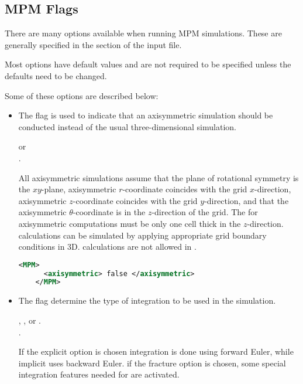 \subsection{MPM Flags} \label{Sec:MPMFlags}

There are many options available when running MPM simulations.  These
are generally specified in the  section of the input file.
\begin{NoteBox}
Most options have default values and are not required to be specified
unless the defaults need to be changed.
\end{NoteBox}

Some of these options are described below:
\begin{itemize}
  \item {}  The  flag is used
    to indicate that an axisymmetric simulation should be conducted instead
    of the usual three-dimensional simulation.  

      or \\
     .

    All axisymmetric simulations
    assume that the plane of rotational symmetry is the $xy$-plane,
    axisymmetric $r$-coordinate coincides with the grid $x$-direction, 
    axisymmetric $z$-coordinate coincides 
    with the grid $y$-direction, and that the axisymmetric $\theta$-coordinate is 
    in the $z$-direction of the grid. The
     for axisymmetric computations must be only one cell thick
    in the $z$-direction.  calculations can be simulated
    by applying appropriate grid boundary conditions in 3D.  
    calculations are not allowed in \Vaango.
    \begin{lstlisting}[language=XML]
    <MPM>
      <axisymmetric> false </axisymmetric>
    </MPM>
    \end{lstlisting}

  \item {}  The  flag 
    determine the type of integration to be used in the \MPM simulation.

     , , or .\\
     .

    If the explicit option is chosen integration is done using forward Euler,
    while implicit uses backward Euler.  if the fracture option is chosen, some
    special integration features needed for  are activated.


\end{itemize}
